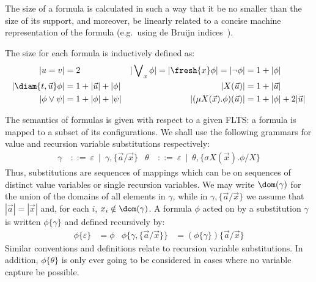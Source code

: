 The size of a formula is calculated in such a way that it be no smaller than the size of its support, and moreover, be linearly related to a concise machine representation of the formula (e.g.\ using de Bruijn indices~\cite{DEBRUIJN1972381}).


\begin{definition}\label{def:formSize}
    The size for each formula is inductively defined as:
  \begin{align*}
    |u=v| &= 2 &
    |\bigvee\nolimits_x\phi| = |\fresh{x}\phi| = |\lnot\phi| &= 1+|\phi|\\
    |\diam{t, \vec u}\phi| &= 1 + |\vec u| + |\phi| &
    | X(\vec u)| &= 1+|\vec u|\\
    |\phi\lor\psi| &= 1+|\phi| + |\psi| &
    | (\mu X(\vec x).\phi)(\vec u)|&= 1+|\phi|+2|\vec u|
    \end{align*}
\end{definition}

The semantics of formulas is given with respect to a given FLTS: a formula is mapped to a subset of its configurations. We shall use the following grammars for value and recursion variable substitutions respectively:
\begin{align*}
\gamma\ &::=\ \varepsilon\ \mid\ \gamma,\{\vec a/\vec x\} %
&
\theta\ &::=\ \varepsilon\  \mid\ \theta,\{\sigma X(\vec x).\phi/X\}
\end{align*}
Thus, substitutions are sequences of mappings which can be on sequences of distinct value variables or single recursion variables.
We may write $\dom(\gamma)$ for the union of the domains of all elements in $\gamma$, while in $\gamma,\{\vec a/\vec x\}$ we assume that $|\vec a|=|\vec x|$ and, for each $i$, $x_i\notin\dom(\gamma)$. A formula $\phi$ acted on by a substitution $\gamma$ is written $\phi\{\gamma\}$ and defined recursively by:
\begin{align*}
  \phi\{\varepsilon\} &= \phi &
  \phi\{\gamma,\{\vec a/\vec x\}\} &=  (\phi\{\gamma\})\{\vec a/\vec x\}
\end{align*}
Similar conventions and definitions relate to recursion variable substitutions.
In addition, $\phi\{\theta\}$ is only ever going to be considered in cases where no variable capture be possible.

